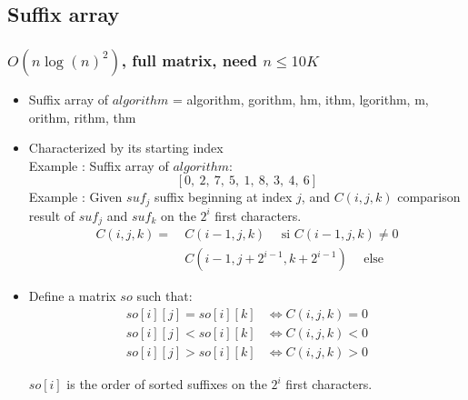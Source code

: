 \subsection{Suffix array}
\subsubsection{$O(n\log(n)^2)$, full matrix, need $n \leq 10K$}
\begin{itemize}
\item Suffix array of $algorithm$ = algorithm, gorithm, hm, ithm, lgorithm, m, orithm, rithm, thm

\item Characterized by its starting index\\
Example : Suffix array of $algorithm$: $$[0, \ 2, \ 7, \ 5, \ 1, \ 8, \ 3, \ 4, \ 6]$$
Example : Given $suf_j$ suffix beginning at index $j$, and $C(i, j, k)$ comparison result of $suf_j$ and $suf_k$ on the $2^i$ first characters.
\begin{align*}
C(i, j, k) = & \ C(i - 1, j, k) \hspace{15pt} \text{si $C(i - 1, j, k) \neq 0$} \\
             & \ C(i - 1, j + 2^{i - 1}, k + 2^{i - 1}) \hspace{15pt} \text{else}
\end{align*}

\end{itemize}
\begin{itemize}

\item Define a matrix $so$ such that:
\begin{align*}
so[i][j] = so[i][k] & \Leftrightarrow C(i, j, k) = 0 \\
so[i][j] < so[i][k] & \Leftrightarrow C(i, j, k) < 0 \\
so[i][j] > so[i][k] & \Leftrightarrow C(i, j, k) > 0
\end{align*}

$so[i]$ is the order of sorted suffixes on the $2^i$ first characters.

\end{itemize}

